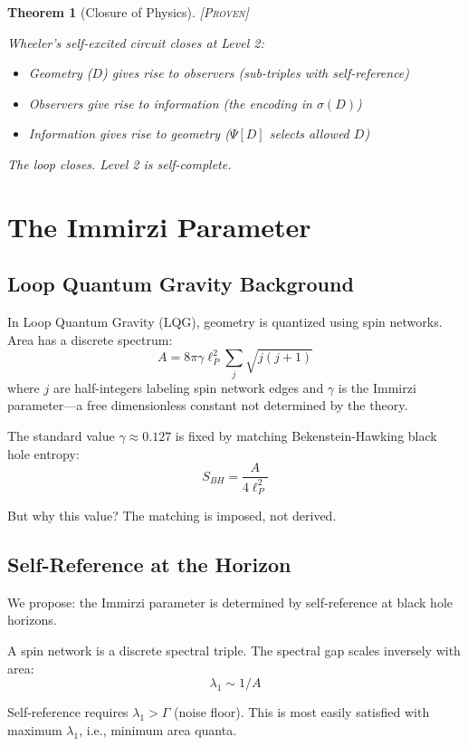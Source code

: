 \documentclass[11pt,a4paper]{article}
\newtheorem{theorem}{Theorem}[section]
\theoremstyle{definition}
\theoremstyle{remark}
\begin{document}
\begin{theorem}[Closure of Physics]
\textsc{[Proven]}

Wheeler's self-excited circuit closes at Level 2:
\begin{itemize}
    \item Geometry ($D$) gives rise to observers (sub-triples with self-reference)
    \item Observers give rise to information (the encoding in $\sigma(D)$)
    \item Information gives rise to geometry ($\Psi[D]$ selects allowed $D$)
\end{itemize}

The loop closes. Level 2 is self-complete.
\end{theorem}

\section{The Immirzi Parameter}

\subsection{Loop Quantum Gravity Background}

In Loop Quantum Gravity (LQG), geometry is quantized using spin networks. Area has a discrete spectrum:
\[
A = 8\pi\gamma \ell_P^2 \sum_j \sqrt{j(j+1)}
\]
where $j$ are half-integers labeling spin network edges and $\gamma$ is the Immirzi parameter---a free dimensionless constant not determined by the theory.

The standard value $\gamma \approx 0.127$ is fixed by matching Bekenstein-Hawking black hole entropy:
\[
S_{BH} = \frac{A}{4\ell_P^2}
\]

But why this value? The matching is imposed, not derived.

\subsection{Self-Reference at the Horizon}

We propose: the Immirzi parameter is determined by self-reference at black hole horizons.

A spin network is a discrete spectral triple. The spectral gap scales inversely with area:
\[
\lambda_1 \sim 1/A
\]

Self-reference requires $\lambda_1 > \Gamma$ (noise floor). This is most easily satisfied with maximum $\lambda_1$, i.e., minimum area quanta.
\end{document}
